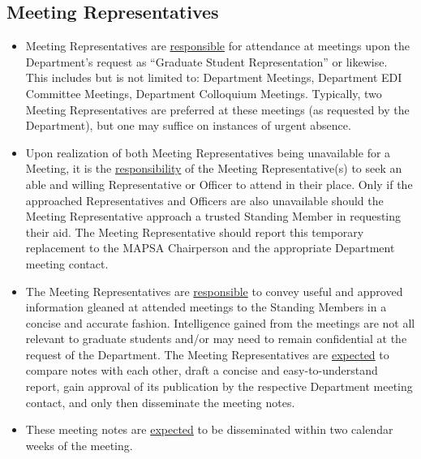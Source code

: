 \documentclass[8pt]{article}
\begin{document}
	\subsection{Meeting Representatives}
	\begin{itemize}
		\item Meeting Representatives are \underline{responsible} for attendance at meetings upon the Department's request as ``Graduate Student Representation'' or likewise.\\
		This includes but is not limited to: Department Meetings, Department EDI Committee Meetings, Department Colloquium Meetings. Typically, two Meeting Representatives are preferred at these meetings (as requested by the Department), but one may suffice on instances of urgent absence. 
		\item Upon realization of both Meeting Representatives being unavailable for a Meeting, it is the \underline{responsibility} of the Meeting Representative(s) to seek an able and willing Representative or Officer to attend in their place. Only if the approached Representatives and Officers are also unavailable should the Meeting Representative approach a trusted Standing Member in requesting their aid. The Meeting Representative should report this temporary replacement to the MAPSA Chairperson and the appropriate Department meeting contact.
		\item The Meeting Representatives are \underline{responsible} to convey useful and approved information gleaned at attended meetings to the Standing Members in a concise and accurate fashion. Intelligence gained from the meetings are not all relevant to graduate students and/or may need to remain confidential at the request of the Department. The Meeting Representatives are \underline{expected} to compare notes with each other, draft a concise and easy-to-understand report, gain approval of its publication by the respective Department meeting contact, and only then disseminate the meeting notes.
		\item These meeting notes are \underline{expected} to be disseminated within two calendar weeks of the meeting.
	\end{itemize} 
\end{document}
